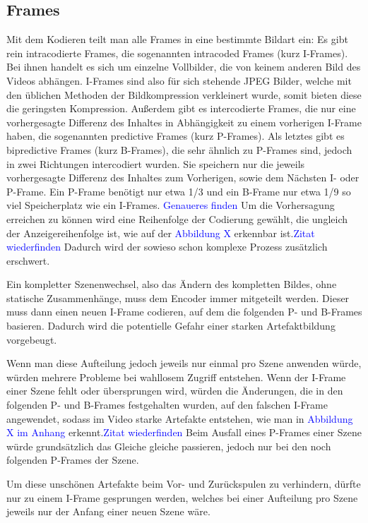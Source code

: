 \subsection{Frames}
Mit dem Kodieren teilt man alle Frames in eine bestimmte Bildart ein:
Es gibt rein intracodierte Frames, die sogenannten intracoded Frames (kurz I-Frames). Bei ihnen handelt es sich um einzelne Vollbilder, die von keinem anderen Bild des Videos abhängen. I-Frames sind also für sich stehende JPEG Bilder, welche mit den üblichen Methoden der Bildkompression verkleinert wurde, somit bieten diese die geringsten Kompression.
Außerdem gibt es intercodierte Frames, die nur eine vorhergesagte Differenz des Inhaltes in Abhängigkeit zu einem vorherigen I-Frame haben, die sogenannten predictive Frames (kurz P-Frames).
Als letztes gibt es bipredictive Frames (kurz B-Frames), die sehr ähnlich zu P-Frames sind, jedoch in zwei Richtungen intercodiert wurden. Sie speichern nur die jeweils vorhergesagte Differenz des Inhaltes zum Vorherigen, sowie dem Nächsten I- oder P-Frame.
Ein P-Frame benötigt nur etwa 1/3 und ein B-Frame nur etwa 1/9 so viel Speicherplatz wie ein I-Frames. \textcolor{blue}{Genaueres finden}
Um die Vorhersagung erreichen zu können wird eine Reihenfolge der Codierung gewählt, die ungleich der Anzeigereihenfolge ist, wie auf der \textcolor{blue}{Abbildung X} erkennbar ist.\textcolor{blue}{Zitat wiederfinden} Dadurch wird der sowieso schon komplexe Prozess zusätzlich erschwert.

Ein kompletter Szenenwechsel, also das Ändern des kompletten Bildes, ohne statische Zusammenhänge, muss dem Encoder immer mitgeteilt werden. Dieser muss dann einen neuen I-Frame codieren, auf dem die folgenden P- und B-Frames basieren. Dadurch wird die potentielle Gefahr einer starken Artefaktbildung vorgebeugt.

Wenn man diese Aufteilung jedoch jeweils nur einmal pro Szene anwenden würde, würden mehrere Probleme bei wahllosem Zugriff entstehen. Wenn der I-Frame einer Szene fehlt oder übersprungen wird, würden die Änderungen, die in den folgenden P- und B-Frames festgehalten wurden, auf den falschen I-Frame angewendet, sodass im Video starke Artefakte entstehen, wie man in \textcolor{blue}{Abbildung X im Anhang} erkennt.\textcolor{blue}{Zitat wiederfinden} Beim Ausfall eines P-Frames einer Szene würde grundsätzlich das Gleiche gleiche passieren, jedoch nur bei den noch folgenden P-Frames der Szene.

Um diese unschönen Artefakte beim Vor- und Zurückspulen zu verhindern, dürfte nur zu einem I-Frame gesprungen werden, welches bei einer Aufteilung pro Szene jeweils nur der Anfang einer neuen Szene wäre.

